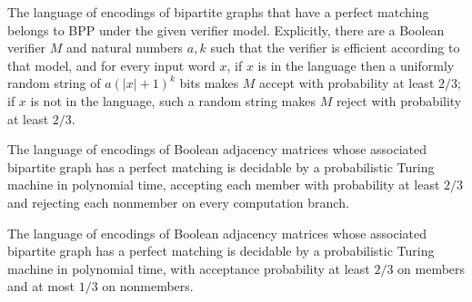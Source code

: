 \begin{theorem}
\label{Randomized.Matching.inBPP_BipartitePerfectMatching}
\leanok
{}
The language of encodings of bipartite graphs that have a perfect matching belongs to
BPP under the given verifier model. Explicitly, there are a Boolean verifier $M$ and
natural numbers $a,k$ such that the verifier is efficient according to that model, and
for every input word $x$, if $x$ is in the language then a uniformly random string of
$a(|x|+1)^k$ bits makes $M$ accept with probability at least $2/3$; if $x$ is not in the
language, such a random string makes $M$ reject with probability at least $2/3$.
\end{theorem}

\begin{theorem}
\label{Randomized.Matching.BipartitePerfectMatching_mem_RP_PTM}
\leanok
{}
The language of encodings of Boolean adjacency matrices whose associated bipartite graph
has a perfect matching is decidable by a probabilistic Turing machine in polynomial
time, accepting each member with probability at least $2/3$ and rejecting each nonmember
on every computation branch.
\end{theorem}

\begin{theorem}
\label{Randomized.Matching.BipartitePerfectMatching_mem_BPP_PTM}
\leanok
{}
The language of encodings of Boolean adjacency matrices whose associated bipartite graph
has a perfect matching is decidable by a probabilistic Turing machine in polynomial
time, with acceptance probability at least $2/3$ on members and at most $1/3$ on
nonmembers.
\end{theorem}
